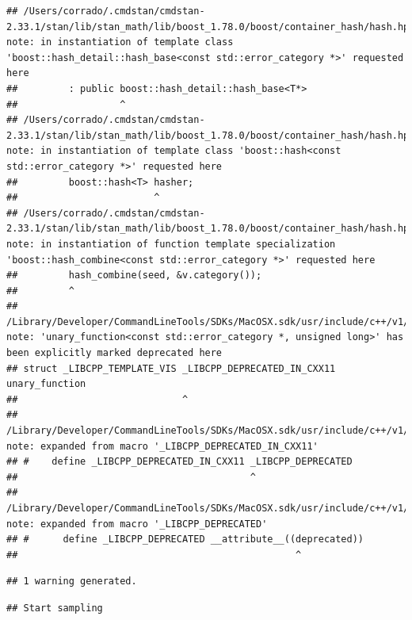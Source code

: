 \documentclass[
]{article}
\begin{document}
\begin{verbatim}
## /Users/corrado/.cmdstan/cmdstan-2.33.1/stan/lib/stan_math/lib/boost_1.78.0/boost/container_hash/hash.hpp:692:18: note: in instantiation of template class 'boost::hash_detail::hash_base<const std::error_category *>' requested here
##         : public boost::hash_detail::hash_base<T*>
##                  ^
## /Users/corrado/.cmdstan/cmdstan-2.33.1/stan/lib/stan_math/lib/boost_1.78.0/boost/container_hash/hash.hpp:420:24: note: in instantiation of template class 'boost::hash<const std::error_category *>' requested here
##         boost::hash<T> hasher;
##                        ^
## /Users/corrado/.cmdstan/cmdstan-2.33.1/stan/lib/stan_math/lib/boost_1.78.0/boost/container_hash/hash.hpp:551:9: note: in instantiation of function template specialization 'boost::hash_combine<const std::error_category *>' requested here
##         hash_combine(seed, &v.category());
##         ^
## /Library/Developer/CommandLineTools/SDKs/MacOSX.sdk/usr/include/c++/v1/__functional/unary_function.h:23:29: note: 'unary_function<const std::error_category *, unsigned long>' has been explicitly marked deprecated here
## struct _LIBCPP_TEMPLATE_VIS _LIBCPP_DEPRECATED_IN_CXX11 unary_function
##                             ^
## /Library/Developer/CommandLineTools/SDKs/MacOSX.sdk/usr/include/c++/v1/__config:825:41: note: expanded from macro '_LIBCPP_DEPRECATED_IN_CXX11'
## #    define _LIBCPP_DEPRECATED_IN_CXX11 _LIBCPP_DEPRECATED
##                                         ^
## /Library/Developer/CommandLineTools/SDKs/MacOSX.sdk/usr/include/c++/v1/__config:810:49: note: expanded from macro '_LIBCPP_DEPRECATED'
## #      define _LIBCPP_DEPRECATED __attribute__((deprecated))
##                                                 ^
\end{verbatim}

\begin{verbatim}
## 1 warning generated.
\end{verbatim}

\begin{verbatim}
## Start sampling
\end{verbatim}
\end{document}
